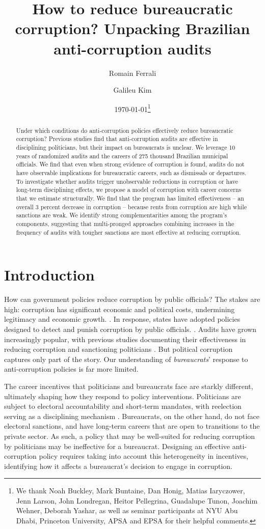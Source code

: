 \documentclass[12pt,a4paper]{article}
\title{How to reduce bureaucratic corruption? Unpacking Brazilian anti-corruption audits}
\date{\today\thanks{
    We thank Noah Buckley, Mark Buntaine, Dan Honig, Matias Iaryczower, Jenn Larson, John Londregan, Heitor Pellegrina, Guadalupe Tunon, Joachim Wehner, Deborah Yashar, as well as seminar participants at NYU Abu Dhabi, Princeton University, APSA and EPSA for their helpful comments. 
}}
\author[1]{Romain Ferrali}
\author[2]{Galileu Kim}
\affil[1]{NYU Abu Dhabi}
\affil[2]{Princeton University}
\theoremstyle{definition}
\begin{document}
\maketitle

\begin{abstract}
    Under which conditions do anti-corruption policies effectively reduce bureaucratic corruption? Previous studies find that anti-corruption audits are effective in disciplining politicians, but their impact on bureaucrats is unclear. We leverage 10 years of randomized audits and the careers of 275 thousand Brazilian municipal officials. We find that even when strong evidence of corruption is found, audits do not have observable implications for bureaucratic careers, such as dismissals or departures. To investigate whether audits trigger unobservable reductions in corruption or have long-term disciplining effects, we propose a model of corruption with career concerns that we estimate structurally. We find that the program has limited effectiveness -- an overall 3 percent decrease in corruption -- because rents from corruption are high while sanctions are weak.  We identify strong complementarities among the program’s components, suggesting that multi-pronged approaches combining increases in the frequency of audits with tougher sanctions are most effective at reducing corruption. 
\end{abstract}

\newpage

\section{Introduction}
\label{sec:intro}

How can government policies reduce corruption by public officials? The stakes are high: corruption has significant economic and political costs, undermining legitimacy and economic growth. \citep[e.g.][]{RoseAckerman2016, Rothstein2011,fisman_are_2007}. In response, states have adopted policies designed to detect and punish corruption by public officials. \citep{chen2018busting}. Audits have grown increasingly popular, with previous studies documenting their effectiveness in reducing corruption and sanctioning politicians \citep{nyblade2008cheats, ferraz_electoral_2011,bobonis2016}. But political corruption captures only part of the story. Our understanding of \emph{bureaucrats}' response to anti-corruption policies is far more limited.

The career incentives that politicians and bureaucrats face are starkly different, ultimately shaping how they respond to policy interventions. Politicians are subject to electoral accountability and short-term mandates, with reelection serving as a disciplining mechanism \citep{besley_principled_2006, ferraz_electoral_2007}. Bureaucrats, on the other hand, do not face electoral sanctions, and have long-term careers that are open to transitions to the private sector. As such, a policy that may be well-suited for reducing corruption by politicians may be ineffective for a bureaucrat. Designing an effective anti-corruption policy requires taking into account this heterogeneity in incentives, identifying how it affects a bureaucrat's decision to engage in corruption.
\end{document}
